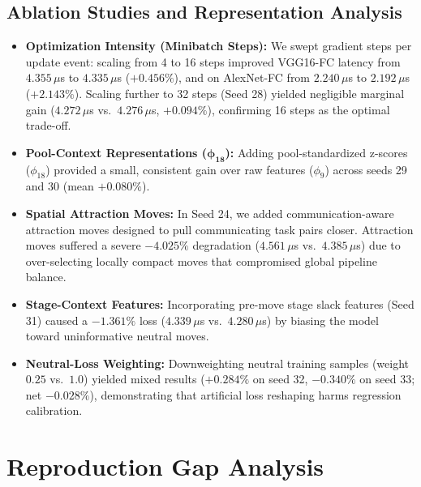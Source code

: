 \documentclass[10pt,conference]{IEEEtran}
\begin{document}
\subsection{Ablation Studies and Representation Analysis}
\begin{itemize}
  \item \textbf{Optimization Intensity (Minibatch Steps):} We swept gradient steps per update event: scaling from 4 to 16 steps improved VGG16-FC latency from $4.355\,\mu$s to $4.335\,\mu$s ($+0.456\%$), and on AlexNet-FC from $2.240\,\mu$s to $2.192\,\mu$s ($+2.143\%$). Scaling further to 32 steps (Seed 28) yielded negligible marginal gain ($4.272\,\mu$s vs.\ $4.276\,\mu$s, $+0.094\%$), confirming 16 steps as the optimal trade-off.
  \item \textbf{Pool-Context Representations ($\bm{\phi_{18}}$):} Adding pool-standardized z-scores ($\phi_{18}$) provided a small, consistent gain over raw features ($\phi_9$) across seeds 29 and 30 (mean $+0.080\%$).
  \item \textbf{Spatial Attraction Moves:} In Seed 24, we added communication-aware attraction moves designed to pull communicating task pairs closer. Attraction moves suffered a severe $\mathbf{-4.025\%}$ degradation ($4.561\,\mu$s vs.\ $4.385\,\mu$s) due to over-selecting locally compact moves that compromised global pipeline balance.
  \item \textbf{Stage-Context Features:} Incorporating pre-move stage slack features (Seed 31) caused a $\mathbf{-1.361\%}$ loss ($4.339\,\mu$s vs.\ $4.280\,\mu$s) by biasing the model toward uninformative neutral moves.
  \item \textbf{Neutral-Loss Weighting:} Downweighting neutral training samples (weight $0.25$ vs.\ $1.0$) yielded mixed results ($+0.284\%$ on seed 32, $-0.340\%$ on seed 33; net $-0.028\%$), demonstrating that artificial loss reshaping harms regression calibration.
\end{itemize}

\section{Reproduction Gap Analysis}
\label{sec:repro-gap}
\end{document}
